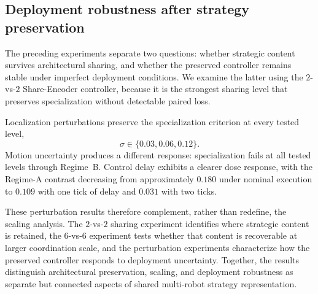 \subsection{Deployment robustness after strategy preservation}
\label{sec:exp-robustness}

The preceding experiments separate two questions: whether strategic content
survives architectural sharing, and whether the preserved controller remains
stable under imperfect deployment conditions. We examine the latter using the
$2$-vs-$2$ Share-Encoder controller, because it is the strongest sharing level
that preserves specialization without detectable paired loss.

Localization perturbations preserve the specialization criterion at every
tested level,
\[
    \sigma\in\{0.03,0.06,0.12\}.
\]
Motion uncertainty produces a different response: specialization fails at all
tested levels through Regime~B. Control delay exhibits a clearer dose response,
with the Regime-A contrast decreasing from approximately $0.180$ under nominal
execution to $0.109$ with one tick of delay and $0.031$ with two ticks.

These perturbation results therefore complement, rather than redefine, the
scaling analysis. The $2$-vs-$2$ sharing experiment identifies where strategic
content is retained, the $6$-vs-$6$ experiment tests whether that content is
recoverable at larger coordination scale, and the perturbation experiments
characterize how the preserved controller responds to deployment uncertainty.
Together, the results distinguish architectural preservation, scaling, and
deployment robustness as separate but connected aspects of shared multi-robot
strategy representation.
